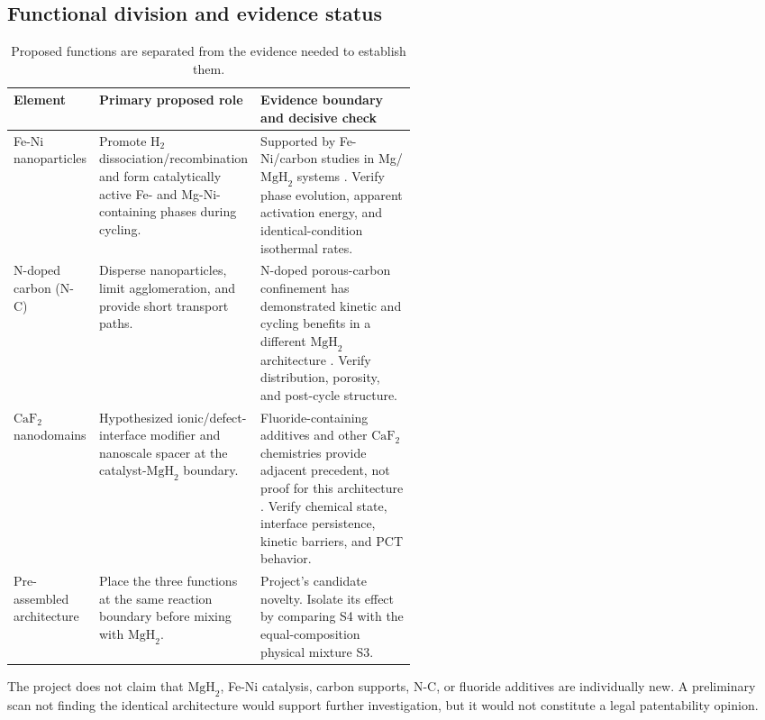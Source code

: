 \documentclass[11pt,a4paper]{article}
\newcommand{\MgHtwo}{\ensuremath{\mathrm{MgH}_{2}}}
\newcommand{\Htwo}{\ensuremath{\mathrm{H}_{2}}}
\newcommand{\CaFtwo}{\ensuremath{\mathrm{CaF}_{2}}}
\newcommand{\NC}{N-doped carbon}
\begin{document}
\subsection{Functional division and evidence status}

\begin{table}[H]
\centering
\small
\caption{Proposed functions are separated from the evidence needed to establish them.}
\label{tab:functions}
\begin{tabularx}{\linewidth}{>{\raggedright\arraybackslash}p{0.21\linewidth} >{\raggedright\arraybackslash}p{0.31\linewidth} >{\raggedright\arraybackslash}X}
\toprule
\textbf{Element} & \textbf{Primary proposed role} & \textbf{Evidence boundary and decisive check} \\
\midrule
Fe-Ni nanoparticles & Promote \Htwo{} dissociation/recombination and form catalytically active Fe- and Mg-Ni-containing phases during cycling. & Supported by Fe-Ni/carbon studies in Mg/\MgHtwo{} systems \cite{ding2020,zhang2024}. Verify phase evolution, apparent activation energy, and identical-condition isothermal rates. \\
\NC{} (N-C) & Disperse nanoparticles, limit agglomeration, and provide short transport paths. & N-doped porous-carbon confinement has demonstrated kinetic and cycling benefits in a different \MgHtwo{} architecture \cite{ren2022}. Verify distribution, porosity, and post-cycle structure. \\
\CaFtwo{} nanodomains & Hypothesized ionic/defect-interface modifier and nanoscale spacer at the catalyst-\MgHtwo{} boundary. & Fluoride-containing additives and other \CaFtwo{} chemistries provide adjacent precedent, not proof for this architecture \cite{deledda2005,jain2015,suarez2011}. Verify chemical state, interface persistence, kinetic barriers, and PCT behavior. \\
Pre-assembled architecture & Place the three functions at the same reaction boundary before mixing with \MgHtwo{}. & Project's candidate novelty. Isolate its effect by comparing S4 with the equal-composition physical mixture S3. \\
\bottomrule
\end{tabularx}
\end{table}

The project does not claim that \MgHtwo{}, Fe-Ni catalysis, carbon supports, N-C, or fluoride additives are individually new. A preliminary scan not finding the identical architecture would support further investigation, but it would not constitute a legal patentability opinion.
\end{document}
